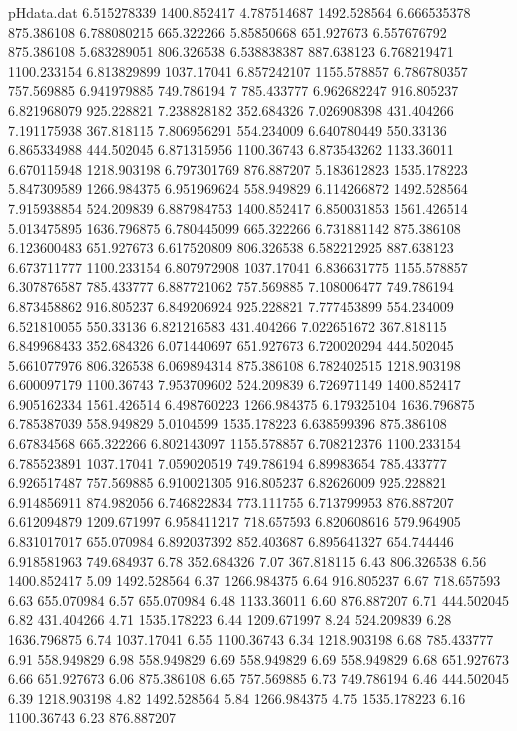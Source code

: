 \begin{filecontents}{pHdata.dat}
6.515278339	1400.852417
4.787514687	1492.528564
6.666535378	875.386108
6.788080215	665.322266
5.85850668	651.927673
6.557676792	875.386108
5.683289051	806.326538
6.538838387	887.638123
6.768219471	1100.233154
6.813829899	1037.17041
6.857242107	1155.578857
6.786780357	757.569885
6.941979885	749.786194
7	785.433777
6.962682247	916.805237
6.821968079	925.228821
7.238828182	352.684326
7.026908398	431.404266
7.191175938	367.818115
7.806956291	554.234009
6.640780449	550.33136
6.865334988	444.502045
6.871315956	1100.36743
6.873543262	1133.36011
6.670115948	1218.903198
6.797301769	876.887207
5.183612823	1535.178223
5.847309589	1266.984375
6.951969624	558.949829
6.114266872	1492.528564
7.915938854	524.209839
6.887984753	1400.852417
6.850031853	1561.426514
5.013475895	1636.796875
6.780445099	665.322266
6.731881142	875.386108
6.123600483	651.927673
6.617520809	806.326538
6.582212925	887.638123
6.673711777	1100.233154
6.807972908	1037.17041
6.836631775	1155.578857
6.307876587	785.433777
6.887721062	757.569885
7.108006477	749.786194
6.873458862	916.805237
6.849206924	925.228821
7.777453899	554.234009
6.521810055	550.33136
6.821216583	431.404266
7.022651672	367.818115
6.849968433	352.684326
6.071440697	651.927673
6.720020294	444.502045
5.661077976	806.326538
6.069894314	875.386108
6.782402515	1218.903198
6.600097179	1100.36743
7.953709602	524.209839
6.726971149	1400.852417
6.905162334	1561.426514
6.498760223	1266.984375
6.179325104	1636.796875
6.785387039	558.949829
5.0104599	1535.178223
6.638599396	875.386108
6.67834568	665.322266
6.802143097	1155.578857
6.708212376	1100.233154
6.785523891	1037.17041
7.059020519	749.786194
6.89983654	785.433777
6.926517487	757.569885
6.910021305	916.805237
6.82626009	925.228821
6.914856911	874.982056
6.746822834	773.111755
6.713799953	876.887207
6.612094879	1209.671997
6.958411217	718.657593
6.820608616	579.964905
6.831017017	655.070984
6.892037392	852.403687
6.895641327	654.744446
6.918581963	749.684937
6.78 	352.684326
7.07 	367.818115
6.43 	806.326538
6.56 	1400.852417
5.09 	1492.528564
6.37 	1266.984375
6.64 	916.805237
6.67 	718.657593
6.63 	655.070984
6.57 	655.070984
6.48 	1133.36011
6.60 	876.887207
6.71 	444.502045
6.82 	431.404266
4.71 	1535.178223
6.44 	1209.671997
8.24 	524.209839
6.28 	1636.796875
6.74 	1037.17041
6.55 	1100.36743
6.34 	1218.903198
6.68 	785.433777
6.91 	558.949829
6.98 	558.949829
6.69 	558.949829
6.69 	558.949829
6.68 	651.927673
6.66 	651.927673
6.06 	875.386108
6.65 	757.569885
6.73 	749.786194
6.46 	444.502045
6.39 	1218.903198
4.82 	1492.528564
5.84 	1266.984375
4.75 	1535.178223
6.16 	1100.36743
6.23 	876.887207

\end{filecontents}
